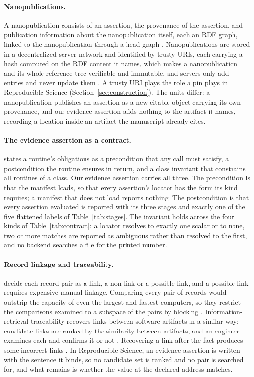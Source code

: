 \paragraph{Nanopublications.} A nanopublication consists of an assertion, the provenance of the
assertion, and publication information about the nanopublication itself, each an RDF graph, linked
to the nanopublication through a head graph \citep{groth2013nanopubguidelines}. Nanopublications are stored in a decentralized server network
and identified by trusty URIs, each carrying a hash computed on the RDF content it names, which
makes a nanopublication and its whole reference tree verifiable and immutable, and servers only add
entries and never update them \citep{kuhn2016nanopub}. A trusty URI plays the role a pin plays in
Reproducible Science (Section~\ref{sec:construction}). The units differ: a nanopublication publishes an
assertion as a new citable object carrying its own provenance, and our evidence assertion
adds nothing to the artifact it names, recording a location inside an artifact the manuscript
already cites.

\paragraph{The evidence assertion as a contract.} \citet{meyer1992contract} states a routine's
obligations as a precondition that any call must satisfy, a postcondition the routine ensures in
return, and a class invariant that constrains all routines of a class. Our evidence
assertion carries all three. The precondition is that the manifest loads, so that every assertion's locator
has the form its kind requires; a manifest that does not load reports nothing. The postcondition is
that every assertion evaluated is reported with its three stages and exactly one of the five
flattened labels of Table~\ref{tab:stages}. The invariant holds across the four kinds of
Table~\ref{tab:contract}: a locator resolves to exactly one scalar or to none, two or more matches
are reported as ambiguous rather than resolved to the first, and no backend searches a file for the
printed number.

\paragraph{Record linkage and traceability.} \citet{fellegi1969linkage} decide each record pair as
a link, a non-link or a possible link, and a possible link requires expensive manual linkage.
Comparing every pair of records would outstrip the capacity of even the largest and fastest
computers, so they restrict the comparisons examined to a subspace of the pairs by blocking
\citep{fellegi1969linkage}. Information-retrieval traceability recovers links between software
artifacts in a similar way: candidate links are ranked by the similarity between artifacts, and an
engineer examines each and confirms it or not \citep{borg2013traceability}. Recovering a link
after the fact produces some incorrect links \citep{borg2013traceability}. In Reproducible Science, an evidence
assertion is written with the sentence it binds, so no candidate set is ranked and no pair is searched for, and
what remains is whether the value at the declared address matches.

